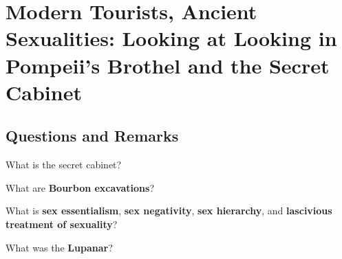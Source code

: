 %
%
%
\chapter{Modern Tourists, Ancient Sexualities: Looking at Looking in Pompeii's Brothel and the Secret Cabinet}
\label{pompeiiBrothel} %








\abstract{}

\section{Questions and Remarks}
\label{sec:QR18}


\begin{qst}
    What is the secret cabinet?
\end{qst}


\begin{qst}
    What are \textbf{Bourbon excavations}?
\end{qst}


\begin{qst}
    What is \textbf{sex essentialism}, \textbf{sex negativity}, \textbf{sex hierarchy}, and \textbf{lascivious treatment of sexuality}?
\end{qst}

\begin{qst}
    What was the \textbf{Lupanar}?
\end{qst}


